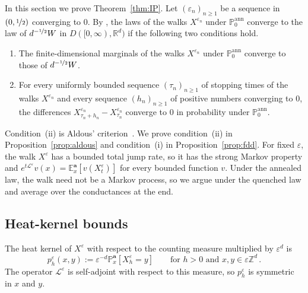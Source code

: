 \documentclass[11pt]{amsart}
\numberwithin{equation}{section}
\newcommand{\Z}{\mathbb{Z}}
\newcommand{\R}{\mathbb{R}}
\newcommand{\E}{\mathbb{E}}
\newcommand{\PP}{\mathbb{P}}
\newcommand{\ba}{\mathbf{a}}
\newcommand{\eps}{\varepsilon}
\newcommand{\Leps}{\mathcal{L}^\varepsilon}
\newcommand{\nf}{\nicefrac}
\begin{document}
In this section we prove Theorem~\ref{thm:IP}.
Let $(\eps_n)_{n \geq 1}$ be a sequence in $(0, \nf12)$ converging to $0$.
By \citet[Theorems~16.10 and~16.11]{Kallenberg2002}, the laws of the walks $X^{\eps_n}$ under $\PP^{\mathrm{ann}}_0$ converge to the law of $d^{-\nf12} W$ in $D([0, \infty), \R^d)$ if the following two conditions hold.
\begin{enumerate}
    \item[\textup{(i)}] The finite-dimensional marginals of the walks $X^{\eps_n}$ under $\PP^{\mathrm{ann}}_0$ converge to those of $d^{-\nf12} W$.
    \item[\textup{(ii)}] For every uniformly bounded sequence $(\tau_n)_{n \geq 1}$ of stopping times of the walks $X^{\eps_n}$ and every sequence $(h_n)_{n \geq 1}$ of positive numbers converging to $0$, the differences $X^{\eps_n}_{\tau_n + h_n} - X^{\eps_n}_{\tau_n}$ converge to $0$ in probability under $\PP^{\mathrm{ann}}_0$.
\end{enumerate}
Condition~(ii) is Aldous' criterion~\citep{Aldous1978}.
We prove condition~(ii) in Proposition~\ref{prop:aldous} and condition~(i) in Proposition~\ref{prop:fdd}.
For fixed $\eps$, the walk $X^\eps$ has a bounded total jump rate, so it has the strong Markov property and $e^{t \Leps} v(x) = \E^\ba_x[v(X^\eps_t)]$ for every bounded function $v$.
Under the annealed law, the walk need not be a Markov process, so we argue under the quenched law and average over the conductances at the end.

\subsection{Heat-kernel bounds} \label{sec:hk}

The heat kernel of $X^\eps$ with respect to the counting measure multiplied by $\eps^d$ is
\begin{equation} \label{eq:def.hk}
    p^\eps_h(x, y) := \eps^{-d} \PP^\ba_x \left[ X^\eps_h = y \right] \qquad \text{for } h > 0 \text{ and } x, y \in \eps \Z^d\,.
\end{equation}
The operator $\Leps$ is self-adjoint with respect to this measure, so $p^\eps_h$ is symmetric in $x$ and $y$.
\end{document}
